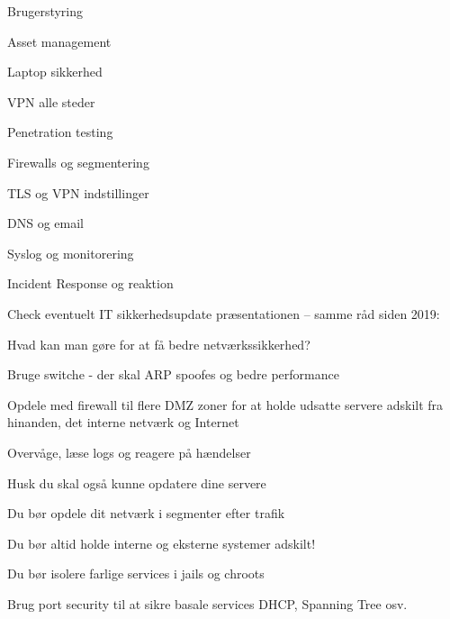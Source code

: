 \documentclass[Screen16to9,17pt]{foils}
\begin{document}
\begin{list2}
\item Brugerstyring
\item Asset management
\item Laptop sikkerhed
\item VPN alle steder
\item Penetration testing
\item Firewalls og segmentering
\item TLS og VPN indstillinger
\item DNS og email
\item Syslog og monitorering
\item Incident Response og reaktion
\end{list2}

Check eventuelt IT sikkerhedsupdate præsentationen -- samme råd siden 2019:\\
{\small{}}


\begin{list1}
\item Hvad kan man gøre for at få bedre netværkssikkerhed?
\begin{list2}
\item Bruge switche - der skal ARP spoofes og bedre performance
\item Opdele med firewall til flere DMZ zoner for at holde
      udsatte servere adskilt fra hinanden, det interne netværk og
      Internet
\item Overvåge, læse logs og reagere på hændelser
\end{list2}
\item Husk du skal også kunne opdatere dine servere
\end{list1}



\begin{list1}
\item Du bør opdele dit netværk i segmenter efter trafik
\item Du bør altid holde interne og eksterne systemer adskilt!
\item Du bør isolere farlige services i jails og chroots
\item Brug port security til at sikre basale services DHCP, Spanning Tree osv.
\end{list1}






\slidenext
\end{document}
